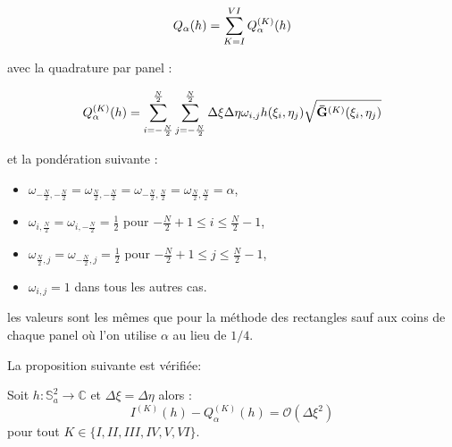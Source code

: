 \begin{equation}
Q_{\alpha}(h)= \displaystyle\sum\limits_{K=I}^{VI} Q^{(K)}_{\alpha}(h)
\end{equation}

avec la quadrature par panel :

\begin{equation}
Q_{\alpha}^{(K)}(h)=\displaystyle\sum\limits_{i = -\frac{N}{2}}^{\frac{N}{2}}\displaystyle\sum\limits_{j = -\frac{N}{2}}^{\frac{N}{2}} \Delta \xi \Delta \eta \omega_{i,j} h(\xi_i, \eta_j) \sqrt{\mathbf{\bar{G}}^{(K)}(\xi_i, \eta_j)}
\label{eq:alpha par panel}
\end{equation}

et la pondération suivante :

\begin{itemize}
\item $\omega_{-\frac{N}{2},-\frac{N}{2}}=\omega_{\frac{N}{2},-\frac{N}{2}}=\omega_{-\frac{N}{2},\frac{N}{2}}=\omega_{\frac{N}{2},\frac{N}{2}}=\alpha$,
\item $\omega_{i,\frac{N}{2}}=\omega_{i,-\frac{N}{2}}=\frac{1}{2}$ pour $-\frac{N}{2}+1 \leq i \leq \frac{N}{2}-1$,
\item $\omega_{\frac{N}{2},j}=\omega_{-\frac{N}{2},j}=\frac{1}{2}$ pour $-\frac{N}{2}+1 \leq j \leq \frac{N}{2}-1$,
\item $\omega_{i,j}=1$ dans tous les autres cas.
\end{itemize}

les valeurs sont les mêmes que pour la méthode des rectangles sauf aux coins de chaque panel où l'on utilise $\alpha$ au lieu de $1/4$.

La proposition suivante est vérifiée:

\begin{proposition}
Soit $h: \mathbb{S}_a^2 \rightarrow \mathbb{C}$ et $\Delta \xi = \Delta \eta$ alors :
\begin{equation}
I^{(K)}(h) - Q^{(K)}_{\alpha}(h) = \mathcal{O} \left( \Delta \xi^2 \right)
\end{equation}
pour tout $K \in \lbrace I, II, III, IV, V, VI \rbrace$.
\label{prop:consistance alpha panel}
\end{proposition}

